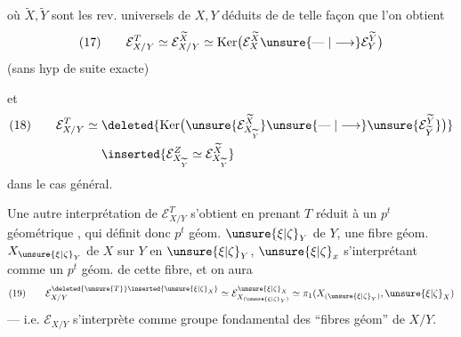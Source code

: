 
où $\widetilde X,\widetilde Y$ sont les rev. universels de $X,Y$ déduits de  de telle façon que l'on obtient
\[
(17)\qquad \mathcal E_{X/Y}^T\simeq\mathcal E_{X/Y}^{\widetilde X}\simeq\operatorname{Ker}\bigl(\mathcal E_X^{\widetilde X}\unsure{\mathrel{\text{---}}|\longrightarrow}\mathcal E_Y^{\widetilde Y}\bigr)
\]
(sans hyp de suite exacte)

et
\[
\begin{aligned}
(18)\qquad \mathcal E_{X/Y}^T\simeq{}&\deleted{\operatorname{Ker}\bigl(\unsure{\mathcal E_{X_{\widetilde Y}}^{\widetilde X}}\unsure{\mathrel{\text{---}}|\longrightarrow}\unsure{\mathcal E_{\widetilde Y}^{\widetilde Y}}\bigr)}\\
&\inserted{\mathcal E_{X_{\widetilde Y}}^Z\simeq\mathcal E_{X_{\widetilde Y}}^{\widetilde X}}
\end{aligned}
\]
dans le cas général.


Une autre interprétation de $\mathcal E_{X/Y}^T$ s'obtient en prenant $T$ réduit à un $p^t$ géométrique , qui définit donc  $p^t$ géom. $\unsure{\xi|\zeta}_Y$ de $Y$, une fibre géom. $X_{\unsure{\xi|\zeta}_Y}$ de $X$ sur $Y$ en $\unsure{\xi|\zeta}_Y$, $\unsure{\xi|\zeta}_x$ s'interprétant comme un $p^t$ géom. de cette fibre, et on aura
\[
(19)\qquad \mathcal E_{X/Y}^{\deleted{\unsure{T}}\inserted{\unsure{\xi|\zeta}_X}}\simeq\mathcal E_{X_{(\unsure{\xi|\zeta}_Y)}}^{\unsure{\xi|\zeta}_X}\simeq\pi_1(X_{(\unsure{\xi|\zeta}_Y)},\unsure{\xi|\zeta}_X)
\]
--- i.e. $\mathcal E_{X/Y}$ s'interprète comme groupe fondamental des ``fibres géom'' de $X/Y$.

